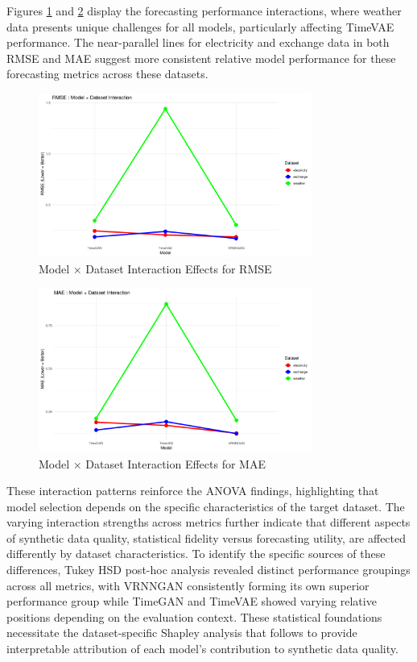 \documentclass[11pt]{article}
\begin{document}
Figures \ref{fig:rmse_interaction} and \ref{fig:mae_interaction} display the forecasting performance interactions, where weather data presents unique challenges for all models, particularly affecting TimeVAE performance. The near-parallel lines for electricity and exchange data in both RMSE and MAE suggest more consistent relative model performance for these forecasting metrics across these datasets.

\begin{figure}[H]
\centering
\includegraphics[width=0.8\textwidth]{assets/interaction_rmse.png}
\caption{Model × Dataset Interaction Effects for RMSE}
\label{fig:rmse_interaction}
\end{figure}

\begin{figure}[H]
\centering
\includegraphics[width=0.8\textwidth]{assets/interaction_mae.png}
\caption{Model × Dataset Interaction Effects for MAE}
\label{fig:mae_interaction}
\end{figure}

These interaction patterns reinforce the ANOVA findings, highlighting that model selection depends on the specific characteristics of the target dataset. The varying interaction strengths across metrics further indicate that different aspects of synthetic data quality, statistical fidelity versus forecasting utility, are affected differently by dataset characteristics. To identify the specific sources of these differences, Tukey HSD post-hoc analysis revealed distinct performance groupings across all metrics, with VRNNGAN consistently forming its own superior performance group while TimeGAN and TimeVAE showed varying relative positions depending on the evaluation context. These statistical foundations necessitate the dataset-specific Shapley analysis that follows to provide interpretable attribution of each model's contribution to synthetic data quality.
\end{document}
